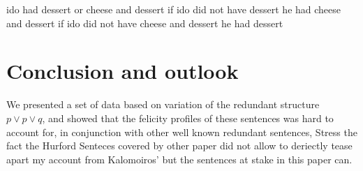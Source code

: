 ido had dessert or cheese and dessert
if ido did not have dessert he had cheese and dessert
if ido did not have cheese and dessert he had dessert

\section{Conclusion and outlook}\label{sec:conclusion}
We presented a set of data based on variation of the redundant structure $p \vee p \vee q$, and showed that the felicity profiles of these sentences was hard to account for, in conjunction with other well known redundant sentences,  
Stress the fact the Hurford Senteces covered by other paper did not allow to deriectly tease apart my account from Kalomoiros' but the sentences at stake in this paper can.





